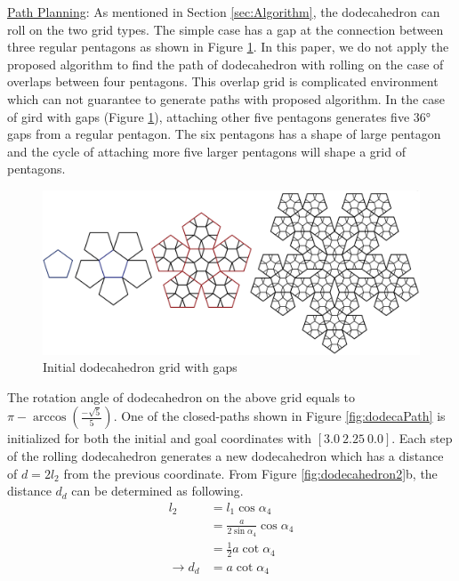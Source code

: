 \noindent\uline{Path Planning}: As mentioned in Section \ref{sec:Algorithm}, the dodecahedron can roll on the two grid types. 
The simple case has a gap at the connection between three regular pentagons as shown in Figure \ref{fig:dodecaGrid}. 
%
In this paper, we do not apply the proposed algorithm to find the path of dodecahedron with rolling on the case of overlaps between four pentagons. 
This overlap grid is complicated environment which can not guarantee to generate paths with proposed algorithm. 
%
In the case of gird with gaps (Figure \ref{fig:dodecaGrid}), attaching other five pentagons generates five $\ang{36}$ gaps from a regular pentagon. 
The six pentagons has a shape of large pentagon and the cycle of attaching more five larger pentagons will shape a grid of pentagons.
%
\begin{figure}[H]
\centering
	\includegraphics[width=\textwidth]{image/dodecaGrid.png}
	\caption{Initial dodecahedron grid with gaps}
	\label{fig:dodecaGrid}
\end{figure}
\noindent The rotation angle of dodecahedron on the above grid equals 
to $\pi-\arccos{(\frac{-\sqrt{5}}{5})}$. 
One of the closed-paths shown in Figure \ref{fig:dodecaPath} is initialized for both the initial and goal coordinates with $[3.0\ 2.25\ 0.0]$.
Each step of the rolling dodecahedron generates a new dodecahedron which has a distance of $d=2l_2$ from the previous coordinate. 
From Figure \ref{fig:dodecahedron2}b, the distance $d_d$ can be determined as following.
\begin{equation*} 
\label{dodeca:eq4}
\begin{split}
l_2 & = l_1\cos{\alpha_4}\\
    & = \frac{a}{2\sin{\alpha_4}}\cos{\alpha_4}\\
    & = \frac{1}{2}a\cot{\alpha_4}\\
\rightarrow d_d & = a\cot{\alpha_4}
\end{split}
\end{equation*}

